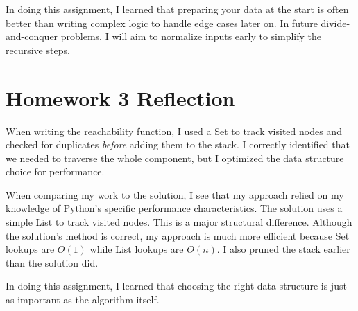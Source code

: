 \documentclass[11pt, letterpaper]{article}
\begin{document}
In doing this assignment, I learned that preparing your data at the start is often better than writing complex logic to handle edge cases later on. In future divide-and-conquer problems, I will aim to normalize inputs early to simplify the recursive steps.

\section*{Homework 3 Reflection}

When writing the reachability function, I used a Set to track visited nodes and checked for duplicates \textit{before} adding them to the stack. I correctly identified that we needed to traverse the whole component, but I optimized the data structure choice for performance.

When comparing my work to the solution, I see that my approach relied on my knowledge of Python's specific performance characteristics. The solution uses a simple List to track visited nodes. This is a major structural difference. Although the solution's method is correct, my approach is much more efficient because Set lookups are $O(1)$ while List lookups are $O(n)$. I also pruned the stack earlier than the solution did.

In doing this assignment, I learned that choosing the right data structure is just as important as the algorithm itself. 
\end{document}
